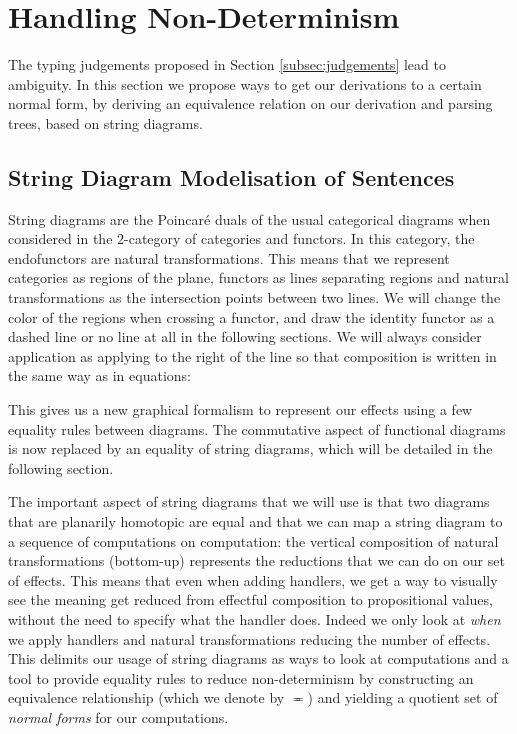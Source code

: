 \section{Handling Non-Determinism}
\label{sec:nondet}
The typing judgements proposed in Section \ref{subsec:judgements} lead to ambiguity.
In this section we propose ways to get our derivations to a certain normal form, by deriving an equivalence relation on our derivation and parsing trees, based on string diagrams.

\subsection{String Diagram Modelisation of Sentences}
\label{subsec:sd}
String diagrams are the Poincaré duals of the usual categorical diagrams when considered in the $2$-category of categories and functors.
In this category, the endofunctors are natural transformations.
This means that we represent categories as regions of the plane, functors as lines separating regions and natural transformations as the intersection points between two lines.
We will change the color of the regions when crossing a functor, and draw the identity functor as a dashed line or no line at all in the following sections.
We will always consider application as applying to the right of the line so that composition is written in the same way as in equations:
\begin{center}
\end{center}
This gives us a new graphical formalism to represent our effects using a few equality rules between diagrams.
The commutative aspect of functional diagrams is now replaced by an equality of string diagrams, which will be detailed in the following section.

The important aspect of string diagrams that we will use is that two diagrams that are planarily homotopic are equal \cite{joyalGeometryTensorCalculus1991} and that we can map a string diagram to a sequence of computations on computation: the vertical composition of natural transformations (bottom-up) represents the reductions that we can do on our set of effects.
This means that even when adding handlers, we get a way to visually see the meaning get reduced from effectful composition to propositional values, without the need to specify what the handler does.
Indeed we only look at \emph{when} we apply handlers and natural transformations reducing the number of effects.
This delimits our usage of string diagrams as ways to look at computations and a tool to provide equality rules to reduce non-determinism by constructing an equivalence relationship (which we denote by $\eqcirc$) and yielding a quotient set of \emph{normal forms} for our computations.

